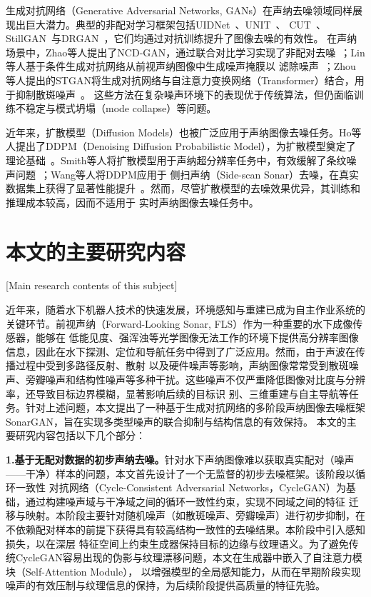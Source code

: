 生成对抗网络（Generative Adversarial Networks, GANs）在声纳去噪领域同样展现出巨大潜力。典型的非配对学习框架包括UIDNet~\cite{hong2020end}、UNIT~\cite{liu2017unsupervised}、
CUT~\cite{park2020contrastive}、StillGAN~\cite{ma2021structure}与DRGAN~\cite{huang2020noise}，它们均通过对抗训练提升了图像去噪的有效性。
在声纳场景中，Zhao等人提出了NCD-GAN，通过联合对比学习实现了非配对去噪~\cite{zhao2023unpaired}；Lin等人基于条件生成对抗网络从前视声纳图像中生成噪声掩膜以
滤除噪声~\cite{lin2023conditional}；Zhou 等人提出的STGAN将生成对抗网络与自注意力变换网络（Transformer）结合，用于抑制散斑噪声~\cite{zhou2023stgan}。
这些方法在复杂噪声环境下的表现优于传统算法，但仍面临训练不稳定与模式坍塌（mode collapse）等问题。

近年来，扩散模型（Diffusion Models）也被广泛应用于声纳图像去噪任务。Ho等人提出了DDPM（Denoising Diffusion Probabilistic Model），为扩散模型奠定了
理论基础~\cite{ho2020denoising}。Smith等人将扩散模型用于声纳超分辨率任务中，有效缓解了条纹噪声问题~\cite{bryan2025diffusion}；Wang等人将DDPM应用于
侧扫声纳（Side-scan Sonar）去噪，在真实数据集上获得了显著性能提升~\cite{yang2023side}。然而，尽管扩散模型的去噪效果优异，其训练和推理成本较高，因而不适用于
实时声纳图像去噪任务中。

\section{本文的主要研究内容}[Main research contents of this subject]

近年来，随着水下机器人技术的快速发展，环境感知与重建已成为自主作业系统的关键环节。前视声纳（Forward-Looking Sonar, FLS）作为一种重要的水下成像传感器，能够在
低能见度、强浑浊等光学图像无法工作的环境下提供高分辨率图像信息，因此在水下探测、定位和导航任务中得到了广泛应用。然而，由于声波在传播过程中受到多路径反射、散射
以及硬件噪声等影响，声纳图像常常受到散斑噪声、旁瓣噪声和结构性噪声等多种干扰。这些噪声不仅严重降低图像对比度与分辨率，还导致目标边界模糊，显著影响后续的目标识
别、三维重建与自主导航等任务。针对上述问题，本文提出了一种基于生成对抗网络的多阶段声纳图像去噪框架SonarGAN，旨在实现多类型噪声的联合抑制与结构信息的有效保持。
本文的主要研究内容包括以下几个部分：

\textbf{1.基于无配对数据的初步声纳去噪。}针对水下声纳图像难以获取真实配对（噪声——干净）样本的问题，本文首先设计了一个无监督的初步去噪框架。该阶段以循环一致性
对抗网络（Cycle-Consistent Adversarial Networks，CycleGAN）\cite{zhu2017unpaired}为基础，通过构建噪声域与干净域之间的循环一致性约束，实现不同域之间的特征
迁移与映射。本阶段主要针对随机噪声（如散斑噪声、旁瓣噪声）进行初步抑制，在不依赖配对样本的前提下获得具有较高结构一致性的去噪结果。本阶段中引入感知损失，以在深层
特征空间上约束生成器保持目标的边缘与纹理语义。为了避免传统CycleGAN容易出现的伪影与纹理漂移问题，本文在生成器中嵌入了自注意力模块（Self-Attention Module），
以增强模型的全局感知能力，从而在早期阶段实现噪声的有效压制与纹理信息的保持，为后续阶段提供高质量的特征先验。


